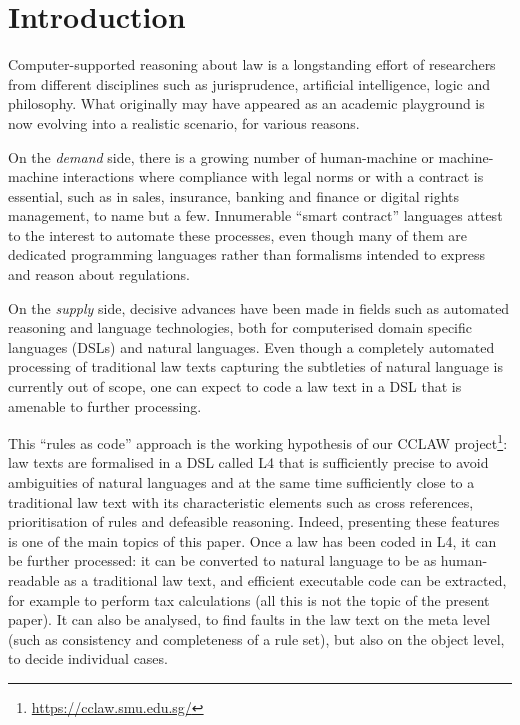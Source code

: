 \section{Introduction}\label{sec:introduction}

Computer-supported reasoning about law is a longstanding effort of researchers
from different disciplines such as jurisprudence, artificial intelligence, logic and
philosophy. What originally may have appeared as an academic playground is
now evolving into a realistic scenario, for various reasons. 

On the \emph{demand} side, there is a growing number of human-machine or
machine-machine interactions where compliance with legal norms or with a contract is essential,
such as in sales, insurance, banking and finance or digital rights management, to name but
a few. Innumerable ``smart contract'' languages attest to the interest to
automate these processes, even though many of them are dedicated
programming languages rather than formalisms intended to express and reason about
regulations.

On the \emph{supply} side, decisive advances have been made in fields such as
automated reasoning and language technologies, both for computerised domain
specific languages (DSLs) and natural languages. Even though a completely
automated processing of traditional law texts capturing the subtleties of
natural language is currently out of scope, one can expect to code a law text
in a DSL that is amenable to further processing.

This ``rules as code'' approach is the working hypothesis of our CCLAW
project\footnote{\url{https://cclaw.smu.edu.sg/}}: law texts are formalised in
a DSL called L4 that is sufficiently precise to avoid ambiguities of natural
languages and at the same time sufficiently close to a traditional law text
with its characteristic elements such as cross references, prioritisation of
rules and defeasible reasoning. Indeed, presenting these features is one of
the main topics of this paper. Once a law has been coded in L4, it can
be further processed: it can be converted to natural language \citep{listemnmaa2021cnl} to
be as human-readable as a traditional law text, and efficient executable code can be
extracted, for example to perform tax calculations (all this is not the topic
of the present paper). It can also be analysed, to find faults in the law
text on the meta level (such as consistency and completeness of a rule set),
but also on the object level, to decide individual cases.

